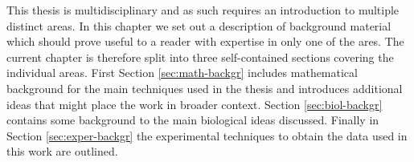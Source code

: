 
This thesis is multidisciplinary and as such requires an introduction to multiple distinct areas. In this chapter we set out a description of background material which should prove useful to a reader with expertise in only one of the ares. The current chapter is therefore split into three self-contained sections covering the individual areas. First Section \ref{sec:math-backgr} includes mathematical background for the main techniques used in the thesis and introduces additional ideas that might place the work in broader context. Section \ref{sec:biol-backgr} contains some background to the main biological ideas discussed. Finally in Section \ref{sec:exper-backgr} the experimental techniques to obtain the data used in this work are outlined.



